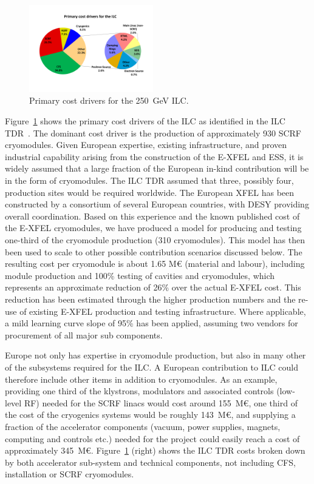 \documentclass[%
 reprint,
 floatfix,
 amsmath,amssymb,
 aps,
]{revtex4-1}
\begin{document}
\begin{figure}[htbp]
\begin{center}
\includegraphics[width=0.48\textwidth]{figures/eap-chp3-ilccostdrivers.pdf}
 \caption{\label{fig:constructionmodel:ILCPrimaryCostDrivers} Primary cost drivers for the 250~GeV ILC.}
\end{center}
\end{figure}

Figure~\ref{fig:constructionmodel:ILCPrimaryCostDrivers} shows the primary cost drivers of the ILC as identified in the ILC
TDR~\cite{Adolphsen:2013kya}. The dominant cost driver is the production of approximately 930 SCRF cryomodules. Given European expertise, 
existing infrastructure, and proven industrial capability arising from the construction 
of the E-XFEL and ESS, it is widely assumed that a large fraction of the European in-kind contribution 
will be in the form of cryomodules. The ILC TDR assumed that three, possibly four, production sites 
would be required worldwide. 
The European XFEL has been constructed by a consortium of several European
countries, with DESY providing overall coordination. Based on this experience 
and the known published cost of the E-XFEL cryomodules, we have produced a model 
for producing and testing one-third of the cryomodule production (310 
cryomodules). This model has then been used to scale to other possible 
contribution scenarios discussed below. The resulting cost per cryomodule is about 1.65 M\euro{} (material and labour), including module production and 100\% 
testing of cavities and cryomodules, which represents an approximate reduction 
of 26\% over the actual E-XFEL cost. This reduction has been estimated through 
the higher production numbers and the re-use of existing E-XFEL production and 
testing infrastructure.  Where applicable, a mild learning curve slope of 95\% 
has been applied, assuming two vendors for procurement of all major sub 
components.

Europe not only has expertise in cryomodule production, but also in many other 
of the subsystems required for the ILC. A European contribution to ILC could 
therefore include other items in addition to cryomodules. As an example, providing 
one third of the klystrons, modulators and associated controls (low-level RF) 
needed for the SCRF linacs would cost around 155~M\euro{}, one third of the cost of 
the cryogenics systems would be roughly 143~M\euro{}, and supplying a fraction of the 
accelerator components (vacuum, power supplies, magnets, computing and controls 
etc.) needed for the project could easily reach a cost of approximately 345~M\euro{}. 
Figure~\ref{fig:constructionmodel:ILCPrimaryCostDrivers} (right) shows the ILC TDR costs broken down by both accelerator sub-system and 
technical components, not including CFS, installation or SCRF cryomodules.
\end{document}
